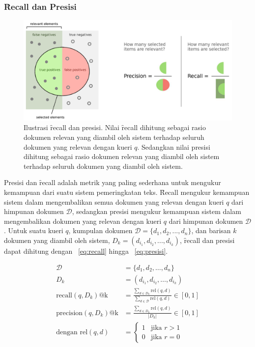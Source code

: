         \subsubsection{\f{Recall} dan Presisi}

        \begin{figure}
            \centering
            \includegraphics[width=1\textwidth]{assets/pics/recall-presisi.png}
            \caption{Ilustrasi \f{recall} dan presisi. Nilai \f{recall} dihitung sebagai rasio dokumen relevan yang diambil oleh sistem terhadap seluruh dokumen yang relevan dengan kueri $q$. Sedangkan nilai presisi dihitung sebagai rasio dokumen relevan yang diambil oleh sistem terhadap seluruh dokumen yang diambil oleh sistem.}
            \label{fig:recall-precision}
        \end{figure}
        
        Presisi dan \f{recall} adalah metrik yang paling sederhana untuk mengukur kemampuan dari suatu sistem pemeringkatan teks. \f{Recall} mengukur kemampuan sistem dalam mengembalikan semua dokumen yang relevan dengan kueri $q$ dari himpunan dokumen $\mathcal{D}$, sedangkan presisi mengukur kemampuan sistem dalam mengembalikan dokumen yang relevan dengan kueri $q$ dari himpunan dokumen $\mathcal{D}$. Untuk suatu kueri $q$, kumpulan dokumen $\mathcal{D} = \{d_1, d_2, ..., d_n\}$, dan barisan $k$ dokumen yang diambil oleh sistem, $D_k = (d_{i_1}, d_{i_2}, ..., d_{i_k})$, \f{recall} dan presisi dapat dihitung dengan \equ~\ref{eq:recall} hingga \equ~\ref{eq:presisi}.

        \begin{align}
            \label{eq:recall}
            \mathcal{D} &= \{d_1, d_2, \dots, d_n\} \\
            D_k &= (d_{i_1}, d_{i_2}, \dots, d_{i_k}) \\
            \text{recall}(q, D_k)\text{@k} &= \frac{\sum_{d \in D_k} \text{rel}(q, d)}{\sum_{d \in \mathcal{D}} \text{rel}(q, d)} \in [0, 1] \\
            \label{eq:presisi}
            \text{precision}(q, D_k)\text{@k} &= \frac{\sum_{d \in D_k} \text{rel}(q, d)}{|D_k|} \in [0, 1] \\
            \label{eq:rel}
            \text{dengan } \text{rel}(q, d) &= \begin{cases} 
            1 & \text{jika } r > 1 \\
            0 & \text{jika } r = 0
            \end{cases}        
        \end{align}

